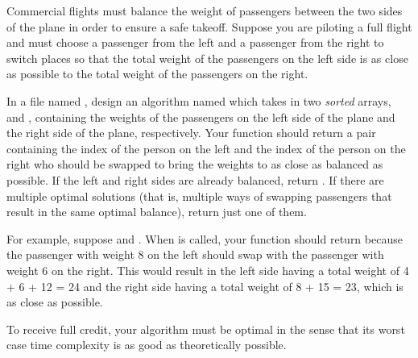 \begin{progprob}
    Commercial flights must balance the weight of passengers between the two
    sides of the plane in order to ensure a safe takeoff. Suppose you are piloting a
    full flight and must choose a passenger from the left and a passenger from
    the right to switch places so that the total weight of the passengers on
    the left side is as close as possible to the total weight of the passengers
    on the right.

    In a file named , design an algorithm named 
    which takes in two \emph{sorted} arrays,  and , containing the weights
    of the passengers on the left side of the plane and the right side of the plane, respectively.
    Your function should return a pair  containing
    the index of the person on  the left and the index of the person on the
    right who should be swapped to bring the weights to as close as balanced as
    possible. If the left and right sides are already balanced, return
    . If there are multiple optimal solutions (that is, multiple
    ways of swapping passengers that result in the same optimal balance),
    return just one of them.

    For example, suppose  and .
    When  is called, your function should return
     because the passenger with weight 8 on the left should swap
    with the passenger with weight 6 on the right. This would result in the
    left side having a total weight of 4 + 6 + 12 = 24 and the right side
    having a total weight of 8 + 15 = 23, which is as close as possible.

    To receive full credit, your algorithm must be optimal in the sense that its worst
    case time complexity is as good as theoretically possible.

    \begin{soln}

        \inputminted{python}{\thisdir/include-solution/balance.py}

    \end{soln}
\end{progprob}
